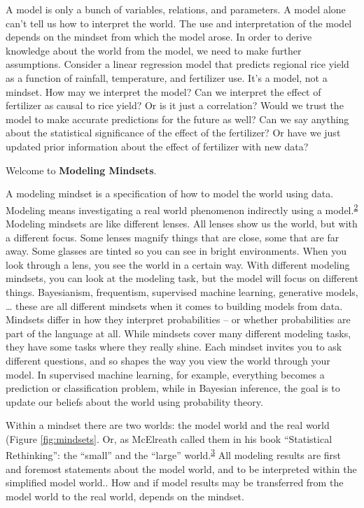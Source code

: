 \documentclass[
  10pt,
]{scrbook}
\begin{document}
A model is only a bunch of variables, relations, and parameters.
A model alone can't tell us how to interpret the world.
The use and interpretation of the model depends on the mindset from which the model arose.
In order to derive knowledge about the world from the model, we need to make further assumptions.
Consider a linear regression model that predicts regional rice yield as a function of rainfall, temperature, and fertilizer use.
It's a model, not a mindset.
How may we interpret the model?
Can we interpret the effect of fertilizer as causal to rice yield? Or is it just a correlation?
Would we trust the model to make accurate predictions for the future as well?
Can we say anything about the statistical significance of the effect of the fertilizer?
Or have we just updated prior information about the effect of fertilizer with new data?

Welcome to \textbf{Modeling Mindsets}.

A modeling mindset is a specification of how to model the world using data.
Modeling means investigating a real world phenomenon indirectly using a model.\textsuperscript{\protect\hyperlink{ref-weisberg2007modeler}{2}}
Modeling mindsets are like different lenses.
All lenses show us the world, but with a different focus.
Some lenses magnify things that are close, some that are far away.
Some glasses are tinted so you can see in bright environments.
When you look through a lens, you see the world in a certain way.
With different modeling mindsets, you can look at the modeling task, but the model will focus on different things.
Bayesianism, frequentism, supervised machine learning, generative models, \ldots{} these are all different mindsets when it comes to building models from data.
Mindsets differ in how they interpret probabilities -- or whether probabilities are part of the language at all.
While mindsets cover many different modeling tasks, they have some tasks where they really shine.
Each mindset invites you to ask different questions, and so shapes the way you view the world through your model.
In supervised machine learning, for example, everything becomes a prediction or classification problem, while in Bayesian inference, the goal is to update our beliefs about the world using probability theory.

Within a mindset there are two worlds: the model world and the real world (Figure \ref{fig:mindsets}.
Or, as McElreath called them in his book ``Statistical Rethinking'': the ``small'' and the ``large'' world.\textsuperscript{\protect\hyperlink{ref-mcelreath2020statistical}{3}}
All modeling results are first and foremost statements about the model world, and to be interpreted within the simplified model world..
How and if model results may be transferred from the model world to the real world, depends on the mindset.
\end{document}
